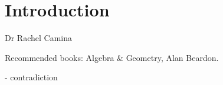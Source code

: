 \newpage
\tableofcontents

\hypertarget{Introduction}{%
\section*{Introduction}\label{Introduction}}

Dr Rachel Camina

Recommended books: Algebra \& Geometry, Alan Beardon.

\begin{notation}
  \Lightning - contradiction
\end{notation} 

\newpage










